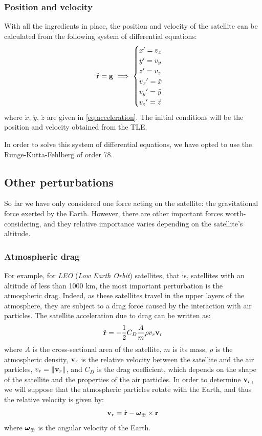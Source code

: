 \documentclass[../main.tex]{subfiles}
\begin{document}
\subsubsection{Position and velocity}
With all the ingredients in place, the position and velocity of the satellite can be calculated from the following system of differential equations:
\begin{equation}
  \ddot{\boldsymbol{\mathrm{r}}}=\boldsymbol{\mathrm{g}}
  \implies
  \begin{cases}
    x'=v_x          \\
    y'=v_y          \\
    z'=v_z          \\
    {v_x}'=\ddot{x} \\
    {v_y}'=\ddot{y} \\
    {v_z}'=\ddot{z}
  \end{cases}
\end{equation}
where $\ddot{x}$, $\ddot{y}$, $\ddot{z}$ are given in \cref{eq:acceleration}. The initial conditions will be the position and velocity obtained from the TLE.

In order to solve this system of differential equations, we have opted to use the Runge-Kutta-Fehlberg of order 78.
\subsection{Other perturbations}
So far we have only considered one force acting on the satellite: the gravitational force exerted by the Earth. However, there are other important forces worth-considering, and they relative importance varies depending on the satellite's altitude.

\subsubsection{Atmospheric drag}
For example, for \emph{LEO} (\emph{Low Earth Orbit}) satellites, that is, satellites with an altitude of less than 1000 km, the most important perturbation is the atmospheric drag. Indeed, as these satellites travel in the upper layers of the atmosphere, they are subject to a drag force caused by the interaction with air particles. The satellite acceleration due to drag can be written as:
\begin{equation}
  \ddot{\boldsymbol{\mathrm{r}}}=-\frac{1}{2}C_D\frac{A}{m}\rho v_r\boldsymbol{\mathrm{v}}_r
\end{equation}
where $A$ is the cross-sectional area of the satellite, $m$ is its mass, $\rho$ is the atmospheric density, $\boldsymbol{\mathrm{v}}_r$ is the relative velocity between the satellite and the air particles, $v_r=\left\|\boldsymbol{\mathrm{v}}_r\right\|$, and $C_D$ is the drag coefficient, which depends on the shape of the satellite and the properties of the air particles. In order to determine $\boldsymbol{\mathrm{v}}_r$, we will suppose that the atmospheric particles rotate with the Earth, and thus the relative velocity is given by:
\begin{equation}
  \boldsymbol{\mathrm{v}}_r=\dot{\boldsymbol{\mathrm{r}}}-\boldsymbol{\mathrm{\omega}}_\oplus\times\boldsymbol{\mathrm{r}}
\end{equation}
where $\boldsymbol{\mathrm{\omega}}_\oplus$ is the angular velocity of the Earth.
\end{document}
